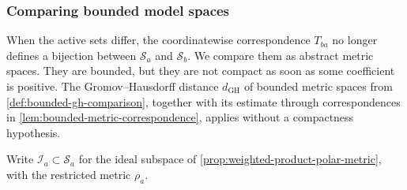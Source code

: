 \subsubsection{Comparing bounded model spaces}
\label{subsec:weighted-product-metric-comparison}

When the active sets differ, the coordinatewise correspondence $T_{ba}$ no longer defines a bijection between $\mathcal S_a$ and $\mathcal S_b$. We compare them as abstract metric spaces. They are bounded, but they are not compact as soon as some coefficient is positive. The Gromov--Hausdorff distance $d_{\mathrm{GH}}$ of bounded metric spaces from \cref{def:bounded-gh-comparison}, together with its estimate through correspondences in \cref{lem:bounded-metric-correspondence}, applies without a compactness hypothesis.

Write $\mathcal I_a\subset\mathcal S_a$ for the ideal subspace of \cref{prop:weighted-product-polar-metric}, with the restricted metric $\rho_a$.

